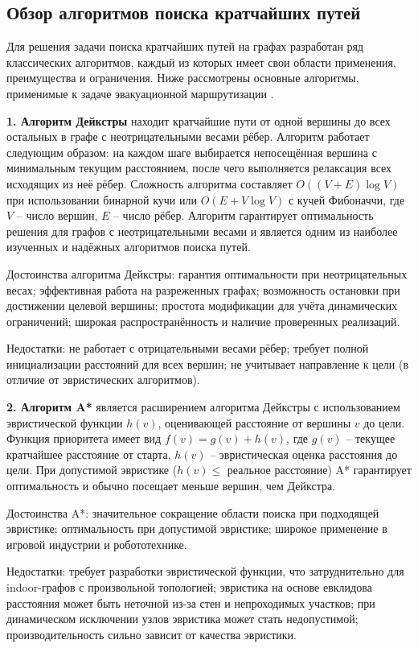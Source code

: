\subsection{Обзор алгоритмов поиска кратчайших путей}

Для решения задачи поиска кратчайших путей на графах разработан ряд классических алгоритмов, каждый из которых имеет свои области применения, преимущества и ограничения. Ниже рассмотрены основные алгоритмы, применимые к задаче эвакуационной маршрутизации \cite{amelichev2022,isaev2023,levitin}.

\textbf{1. Алгоритм Дейкстры} \cite{dijkstra,mirahadi2021} находит кратчайшие пути от одной вершины до всех остальных в графе с неотрицательными весами рёбер. Алгоритм работает следующим образом: на каждом шаге выбирается непосещённая вершина с минимальным текущим расстоянием, после чего выполняется релаксация всех исходящих из неё рёбер. Сложность алгоритма составляет $O((V + E) \log V)$ при использовании бинарной кучи или $O(E + V \log V)$ с кучей Фибоначчи, где $V$ -- число вершин, $E$ -- число рёбер. Алгоритм гарантирует оптимальность решения для графов с неотрицательными весами и является одним из наиболее изученных и надёжных алгоритмов поиска путей.

Достоинства алгоритма Дейкстры: гарантия оптимальности при неотрицательных весах; эффективная работа на разреженных графах; возможность остановки при достижении целевой вершины; простота модификации для учёта динамических ограничений; широкая распространённость и наличие проверенных реализаций.

Недостатки: не работает с отрицательными весами рёбер; требует полной инициализации расстояний для всех вершин; не учитывает направление к цели (в отличие от эвристических алгоритмов).

\textbf{2. Алгоритм A*} является расширением алгоритма Дейкстры с использованием эвристической функции $h(v)$, оценивающей расстояние от вершины $v$ до цели. Функция приоритета имеет вид $f(v) = g(v) + h(v)$, где $g(v)$ -- текущее кратчайшее расстояние от старта, $h(v)$ -- эвристическая оценка расстояния до цели. При допустимой эвристике ($h(v) \leq$ реальное расстояние) A* гарантирует оптимальность и обычно посещает меньше вершин, чем Дейкстра.

Достоинства A*: значительное сокращение области поиска при подходящей эвристике; оптимальность при допустимой эвристике; широкое применение в игровой индустрии и робототехнике.

Недостатки: требует разработки эвристической функции, что затруднительно для indoor-графов с произвольной топологией; эвристика на основе евклидова расстояния может быть неточной из-за стен и непроходимых участков; при динамическом исключении узлов эвристика может стать недопустимой; производительность сильно зависит от качества эвристики.

